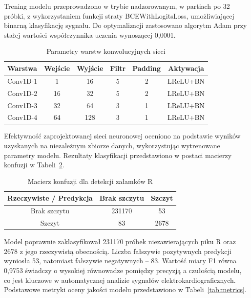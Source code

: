 \documentclass[journal]{IEEEtran}
\begin{document}
Trening modelu przeprowadzono w trybie nadzorowanym, w partiach po 32 próbki, z wykorzystaniem funkcji straty BCEWithLogitsLoss, umożliwiającej binarną klasyfikację sygnału. Do optymalizacji zastosowano algorytm Adam przy stałej wartości współczynnika uczenia wynoszącej 0,0001.

\begin{table}[h!]
\centering
\caption{Parametry warstw konwolucyjnych sieci}
\label{tab:conv_layers}
\begin{tabular}{|l|c|c|c|c|c|}
\hline
\textbf{Warstwa} & \textbf{Wejście} & \textbf{Wyjście} & \textbf{Filtr} & \textbf{Padding} & \textbf{Aktywacja} \\
\hline
Conv1D-1 & 1   & 16  & 5 & 2 & LReLU+BN \\
Conv1D-2 & 16  & 32  & 5 & 2 & LReLU+BN \\
Conv1D-3 & 32  & 64  & 3 & 1 & LReLU+BN \\
Conv1D-4 & 64  & 128 & 3 & 1 & LReLU+BN \\
\hline
\end{tabular}
\end{table}

Efektywność zaprojektowanej sieci neuronowej oceniono na podstawie wyników uzyskanych na niezależnym zbiorze danych, wykorzystując wytrenowane parametry modelu. Rezultaty klasyfikacji przedstawiono w postaci macierzy konfuzji w Tabeli~\ref{tab:conf_matrix}.

\begin{table}[ht]
\centering
\caption{Macierz konfuzji dla detekcji załamków R}
\label{tab:conf_matrix}
\begin{tabular}{|c|c|c|}
\hline
\textbf{Rzeczywiste / Predykcja} & \textbf{Brak szczytu } & \textbf{Szczyt } \\
\hline
Brak szczytu  & 231170 & 53 \\
\hline
Szczyt  & 83 & 2678 \\
\hline
\end{tabular}
\end{table}

\newpage
Model poprawnie zaklasyfikował 231170 próbek niezawierających piku R oraz 2678 z jego rzeczywistą obecnością. Liczba fałszywie pozytywnych predykcji wyniosła 53, natomiast fałszywie negatywnych -- 83. Wartość miary F1 równa 0,9753 świadczy o wysokiej równowadze pomiędzy precyzją a czułością modelu, co jest kluczowe w automatycznej analizie sygnałów elektrokardiograficznych. Podstawowe metryki oceny jakości modelu przedstawiono w Tabeli~\ref{tab:metrics}.
\end{document}
